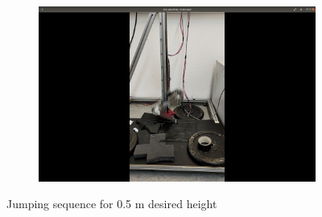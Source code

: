 \documentclass[onecolumn, letter paper]{report}
\begin{document}
\begin{figure}[htb!]
\begin{subfigure}{.24\textwidth}
    \end{subfigure}
    \begin{subfigure}{.24\textwidth}
    \includegraphics[width=\textwidth, trim={25cm 10cm 25cm 10cm}, clip]{figures/0.5m/p5m4.png}
    \end{subfigure}
    \caption{Jumping sequence for 0.5 m desired height}
    \label{fig:sequence5}
\end{figure}
\end{document}
